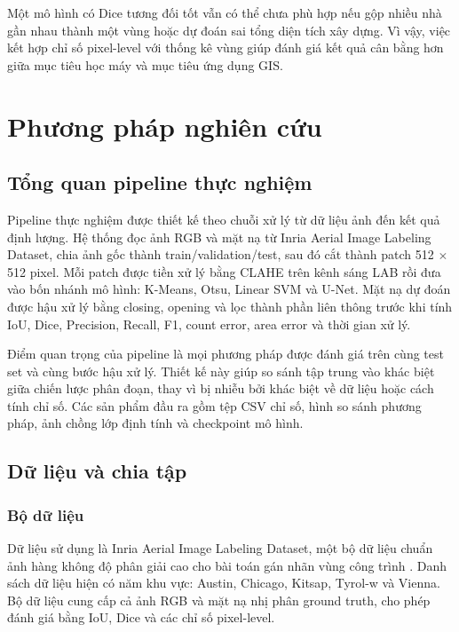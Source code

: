 \documentclass[12pt,a4paper]{report}
\begin{document}
Một mô hình có Dice tương đối tốt vẫn có thể chưa phù hợp nếu gộp nhiều nhà gần nhau thành một vùng hoặc dự đoán sai tổng diện tích xây dựng. Vì vậy, việc kết hợp chỉ số pixel-level với thống kê vùng giúp đánh giá kết quả cân bằng hơn giữa mục tiêu học máy và mục tiêu ứng dụng GIS.

\chapter{Phương pháp nghiên cứu}

\section{Tổng quan pipeline thực nghiệm}

Pipeline thực nghiệm được thiết kế theo chuỗi xử lý từ dữ liệu ảnh đến kết quả định lượng. Hệ thống đọc ảnh RGB và mặt nạ từ Inria Aerial Image Labeling Dataset, chia ảnh gốc thành train/validation/test, sau đó cắt thành patch 512 $\times$ 512 pixel. Mỗi patch được tiền xử lý bằng CLAHE trên kênh sáng LAB rồi đưa vào bốn nhánh mô hình: K-Means, Otsu, Linear SVM và U-Net. Mặt nạ dự đoán được hậu xử lý bằng closing, opening và lọc thành phần liên thông trước khi tính IoU, Dice, Precision, Recall, F1, count error, area error và thời gian xử lý.

Điểm quan trọng của pipeline là mọi phương pháp được đánh giá trên cùng test set và cùng bước hậu xử lý. Thiết kế này giúp so sánh tập trung vào khác biệt giữa chiến lược phân đoạn, thay vì bị nhiễu bởi khác biệt về dữ liệu hoặc cách tính chỉ số. Các sản phẩm đầu ra gồm tệp CSV chỉ số, hình so sánh phương pháp, ảnh chồng lớp định tính và checkpoint mô hình.

\section{Dữ liệu và chia tập}

\subsection{Bộ dữ liệu}

Dữ liệu sử dụng là Inria Aerial Image Labeling Dataset, một bộ dữ liệu chuẩn ảnh hàng không độ phân giải cao cho bài toán gán nhãn vùng công trình \cite{maggiori2017inria}. Danh sách dữ liệu hiện có năm khu vực: Austin, Chicago, Kitsap, Tyrol-w và Vienna. Bộ dữ liệu cung cấp cả ảnh RGB và mặt nạ nhị phân ground truth, cho phép đánh giá bằng IoU, Dice và các chỉ số pixel-level.
\end{document}
